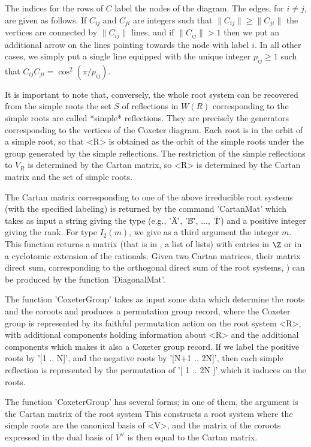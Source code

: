The  indices for the rows of $C$ label the nodes of the diagram. The edges,
for  $i \ne j$, are given as follows. If $C_{ij}$ and $C_{ji}$ are integers
such  that  $\|C_{ij}\|  \ge  \|C_{ji}\|$  the  vertices  are  connected by
$\|C_{ij}\|$  lines, and if $\|C_{ij}\|>1$ then  we put an additional arrow
on  the lines pointing towards the node with label $i$. In all other cases,
we simply put a single line equipped with the unique integer $p_{ij} \ge 1$
such that $C_{ij}C_{ji}=\cos^2 (\pi/p_{ij})$.

It  is important  to note  that, conversely,  the whole  root system can be
recovered  from the  simple roots\:  the set  $S$ of  reflections in $W(R)$
corresponding to the simple roots are called *simple* reflections. They are
precisely  the  generators  corresponding  to  the  vertices of the Coxeter
diagram.  Each  root  is  in  the  orbit  of  a simple root, so that <R> is
obtained  as the orbit of the simple roots under the group generated by the
simple  reflections. The restriction of the  simple reflections to $V_R$ is
determined  by the Cartan matrix, so <R> is determined by the Cartan matrix
and the set of simple roots.

The  Cartan  matrix  corresponding  to  one  of  the above irreducible root
systems   (with  the  specified  labeling)   is  returned  by  the  command
'CartanMat'  which takes as input a  string giving the type (e.g., '\"A\"',
'\"B\"', $\dots$, '\"I\"') and a positive integer giving the rank. For type
$I_2(m)$,  we  give  as  a  third  argument  the integer $m$. This function
returns a matrix (that is in \GAP, a list of lists) with entries in $\Z$ or
in  a cyclotomic  extension of  the rationals.  Given two  Cartan matrices,
their  matrix direct sum, corresponding to the orthogonal direct sum of the
root systems, ) can be produced by the function 'DiagonalMat'.

The  function 'CoxeterGroup' takes  as input some  data which determine the
roots and the coroots and produces a {\GAP} permutation group record, where
the  Coxeter group is represented by its faithful permutation action on the
root  system <R>, with additional  components holding information about <R>
and  the additional components which makes  it also a Coxeter group record.
If  we label the  positive roots by  '[1 .. N]',  and the negative roots by
'[N+1  ..  2\*N]',  then  each  simple  reflection  is  represented  by the
permutation of '[ 1 .. 2\*N ]' which it induces on the roots.


The function 'CoxeterGroup' has several forms; in one of them, the argument
is the Cartan matrix of the root system This constructs a root system where
the  simple roots  are the  canonical basis  of <V>,  and the matrix of the
coroots expressed in the dual basis of $V^\vee$ is then equal to the Cartan
matrix.

